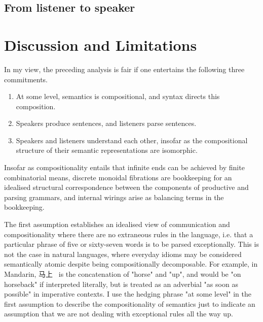 \clearpage

\newpage
\subsection{From listener to speaker}

\section{Discussion and Limitations}

 In my view, the preceding analysis is fair if one entertains the following three commitments.

\begin{enumerate}
\item{At some level, semantics is compositional, and syntax directs this composition.}
\item{Speakers produce sentences, and listeners parse sentences.}
\item{Speakers and listeners understand each other, insofar as the compositional structure of their semantic representations are isomorphic.}
\end{enumerate}

Insofar as compositionality entails that infinite ends can be achieved by finite combinatorial means, discrete monoidal fibrations are bookkeeping for an idealised structural correspondence between the components of productive and parsing grammars, and internal wirings arise as balancing terms in the bookkeeping.\\

\begin{CJK*}{UTF8}{gbsn}
The first assumption establishes an idealised view of communication and compositionality where there are no extraneous rules in the language, i.e. that a particular phrase of five or sixty-seven words is to be parsed exceptionally. This is not the case in natural languages, where everyday idioms may be considered semantically atomic despite being compositionally decomposable. For example, in Mandarin, 马上 \ is the concatenation of "horse" and "up", and would be "on horseback" if interpreted literally, but is treated as an adverbial "as soon as possible" in imperative contexts. I use the hedging phrase "at some level" in the first assumption to describe the compositionality of semantics just to indicate an assumption that we are not dealing with exceptional rules all the way up.\\
\end{CJK*}

